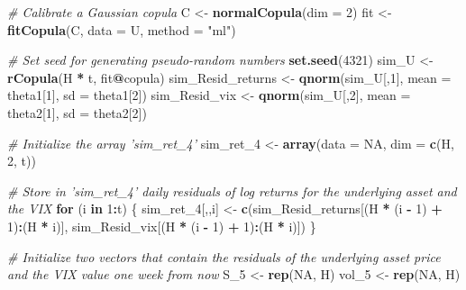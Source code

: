 \documentclass[]{article}
\newenvironment{Shaded}{\begin{snugshade}}{\end{snugshade}}
\newcommand{\CommentTok}[1]{\textcolor[rgb]{0.56,0.35,0.01}{\textit{#1}}}
\newcommand{\ControlFlowTok}[1]{\textcolor[rgb]{0.13,0.29,0.53}{\textbf{#1}}}
\newcommand{\DataTypeTok}[1]{\textcolor[rgb]{0.13,0.29,0.53}{#1}}
\newcommand{\DecValTok}[1]{\textcolor[rgb]{0.00,0.00,0.81}{#1}}
\newcommand{\KeywordTok}[1]{\textcolor[rgb]{0.13,0.29,0.53}{\textbf{#1}}}
\newcommand{\NormalTok}[1]{#1}
\newcommand{\OperatorTok}[1]{\textcolor[rgb]{0.81,0.36,0.00}{\textbf{#1}}}
\newcommand{\OtherTok}[1]{\textcolor[rgb]{0.56,0.35,0.01}{#1}}
\newcommand{\StringTok}[1]{\textcolor[rgb]{0.31,0.60,0.02}{#1}}
\begin{document}
\begin{Shaded}
\begin{Highlighting}[]
\CommentTok{# Calibrate a Gaussian copula}
\NormalTok{C   <-}\StringTok{ }\KeywordTok{normalCopula}\NormalTok{(}\DataTypeTok{dim =} \DecValTok{2}\NormalTok{)}
\NormalTok{fit <-}\StringTok{ }\KeywordTok{fitCopula}\NormalTok{(C, }\DataTypeTok{data =}\NormalTok{ U, }\DataTypeTok{method =} \StringTok{"ml"}\NormalTok{)}

\CommentTok{# Set seed for generating pseudo-random numbers}
\KeywordTok{set.seed}\NormalTok{(}\DecValTok{4321}\NormalTok{)}
\NormalTok{sim_U             <-}\StringTok{ }\KeywordTok{rCopula}\NormalTok{(H }\OperatorTok{*}\StringTok{ }\NormalTok{t, fit}\OperatorTok{@}\NormalTok{copula)}
\NormalTok{sim_Resid_returns <-}\StringTok{ }\KeywordTok{qnorm}\NormalTok{(sim_U[,}\DecValTok{1}\NormalTok{], }\DataTypeTok{mean =}\NormalTok{ theta1[}\DecValTok{1}\NormalTok{], }\DataTypeTok{sd =}\NormalTok{ theta1[}\DecValTok{2}\NormalTok{])}
\NormalTok{sim_Resid_vix     <-}\StringTok{ }\KeywordTok{qnorm}\NormalTok{(sim_U[,}\DecValTok{2}\NormalTok{], }\DataTypeTok{mean =}\NormalTok{ theta2[}\DecValTok{1}\NormalTok{], }\DataTypeTok{sd =}\NormalTok{ theta2[}\DecValTok{2}\NormalTok{])}

\CommentTok{# Initialize the array 'sim_ret_4'}
\NormalTok{sim_ret_}\DecValTok{4}\NormalTok{ <-}\StringTok{ }\KeywordTok{array}\NormalTok{(}\DataTypeTok{data =} \OtherTok{NA}\NormalTok{, }\DataTypeTok{dim =} \KeywordTok{c}\NormalTok{(H, }\DecValTok{2}\NormalTok{, t))}

\CommentTok{# Store in 'sim_ret_4' daily residuals of log returns for the underlying asset and the VIX}
\ControlFlowTok{for}\NormalTok{ (i }\ControlFlowTok{in} \DecValTok{1}\OperatorTok{:}\NormalTok{t) \{}
\NormalTok{  sim_ret_}\DecValTok{4}\NormalTok{[,,i] <-}\StringTok{ }\KeywordTok{c}\NormalTok{(sim_Resid_returns[(H }\OperatorTok{*}\StringTok{ }\NormalTok{(i }\OperatorTok{-}\StringTok{ }\DecValTok{1}\NormalTok{) }\OperatorTok{+}\StringTok{ }\DecValTok{1}\NormalTok{)}\OperatorTok{:}\NormalTok{(H }\OperatorTok{*}\StringTok{ }\NormalTok{i)], sim_Resid_vix[(H }\OperatorTok{*}\StringTok{ }\NormalTok{(i }\OperatorTok{-}\StringTok{ }\DecValTok{1}\NormalTok{) }\OperatorTok{+}\StringTok{ }\DecValTok{1}\NormalTok{)}\OperatorTok{:}\NormalTok{(H }\OperatorTok{*}\StringTok{ }\NormalTok{i)])}
\NormalTok{\}}

\CommentTok{# Initialize two vectors that contain the residuals of the underlying asset price and the VIX value one week from now}
\NormalTok{S_}\DecValTok{5}\NormalTok{   <-}\StringTok{ }\KeywordTok{rep}\NormalTok{(}\OtherTok{NA}\NormalTok{, H)}
\NormalTok{vol_}\DecValTok{5}\NormalTok{ <-}\StringTok{ }\KeywordTok{rep}\NormalTok{(}\OtherTok{NA}\NormalTok{, H)}


\end{Highlighting}
\end{Shaded}
\end{document}
